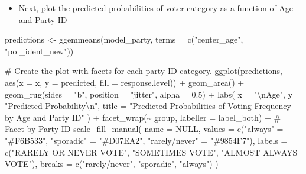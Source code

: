 \documentclass[
  letterpaper,
  DIV=11,
  numbers=noendperiod]{scrartcl}
\newenvironment{Shaded}{\begin{snugshade}}{\end{snugshade}}
\newcommand{\AttributeTok}[1]{\textcolor[rgb]{0.40,0.45,0.13}{#1}}
\newcommand{\CommentTok}[1]{\textcolor[rgb]{0.37,0.37,0.37}{#1}}
\newcommand{\ConstantTok}[1]{\textcolor[rgb]{0.56,0.35,0.01}{#1}}
\newcommand{\FloatTok}[1]{\textcolor[rgb]{0.68,0.00,0.00}{#1}}
\newcommand{\FunctionTok}[1]{\textcolor[rgb]{0.28,0.35,0.67}{#1}}
\newcommand{\NormalTok}[1]{\textcolor[rgb]{0.00,0.23,0.31}{#1}}
\newcommand{\OtherTok}[1]{\textcolor[rgb]{0.00,0.23,0.31}{#1}}
\newcommand{\SpecialCharTok}[1]{\textcolor[rgb]{0.37,0.37,0.37}{#1}}
\newcommand{\StringTok}[1]{\textcolor[rgb]{0.13,0.47,0.30}{#1}}
\providecommand{\tightlist}{%
  \setlength{\itemsep}{0pt}\setlength{\parskip}{0pt}}\usepackage{longtable,booktabs,array}
\begin{document}
\begin{itemize}
\tightlist
\item
  Next, plot the predicted probabilities of voter category as a function
  of Age and Party ID
\end{itemize}

\begin{Shaded}
\begin{Highlighting}[]
\NormalTok{predictions }\OtherTok{\textless{}{-}} \FunctionTok{ggemmeans}\NormalTok{(model\_party, }\AttributeTok{terms =} \FunctionTok{c}\NormalTok{(}\StringTok{"center\_age"}\NormalTok{, }\StringTok{"pol\_ident\_new"}\NormalTok{))}

\CommentTok{\# Create the plot with facets for each party ID category.}
\FunctionTok{ggplot}\NormalTok{(predictions, }\FunctionTok{aes}\NormalTok{(}\AttributeTok{x =}\NormalTok{ x, }\AttributeTok{y =}\NormalTok{ predicted, }\AttributeTok{fill =}\NormalTok{ response.level)) }\SpecialCharTok{+}
  \FunctionTok{geom\_area}\NormalTok{() }\SpecialCharTok{+}
  \FunctionTok{geom\_rug}\NormalTok{(}\AttributeTok{sides =} \StringTok{"b"}\NormalTok{, }\AttributeTok{position =} \StringTok{"jitter"}\NormalTok{, }\AttributeTok{alpha =} \FloatTok{0.5}\NormalTok{) }\SpecialCharTok{+}
  \FunctionTok{labs}\NormalTok{(}
    \AttributeTok{x =} \StringTok{"}\SpecialCharTok{\textbackslash{}n}\StringTok{Age"}\NormalTok{,}
    \AttributeTok{y =} \StringTok{"Predicted Probability}\SpecialCharTok{\textbackslash{}n}\StringTok{"}\NormalTok{,}
    \AttributeTok{title =} \StringTok{"Predicted Probabilities of Voting Frequency by Age and Party ID"}
\NormalTok{  ) }\SpecialCharTok{+}
  \FunctionTok{facet\_wrap}\NormalTok{(}\SpecialCharTok{\textasciitilde{}}\NormalTok{ group, }\AttributeTok{labeller =}\NormalTok{ label\_both) }\SpecialCharTok{+}  \CommentTok{\# Facet by Party ID}
  \FunctionTok{scale\_fill\_manual}\NormalTok{(}
    \AttributeTok{name =} \ConstantTok{NULL}\NormalTok{,}
    \AttributeTok{values =} \FunctionTok{c}\NormalTok{(}\StringTok{"always"} \OtherTok{=} \StringTok{"\#F6B533"}\NormalTok{, }\StringTok{"sporadic"} \OtherTok{=} \StringTok{"\#D07EA2"}\NormalTok{, }\StringTok{"rarely/never"} \OtherTok{=} \StringTok{"\#9854F7"}\NormalTok{),}
    \AttributeTok{labels =} \FunctionTok{c}\NormalTok{(}\StringTok{"RARELY OR NEVER VOTE"}\NormalTok{, }\StringTok{"SOMETIMES VOTE"}\NormalTok{, }\StringTok{"ALMOST ALWAYS VOTE"}\NormalTok{),}
    \AttributeTok{breaks =} \FunctionTok{c}\NormalTok{(}\StringTok{"rarely/never"}\NormalTok{, }\StringTok{"sporadic"}\NormalTok{, }\StringTok{"always"}\NormalTok{)}
\NormalTok{  )}
\end{Highlighting}
\end{Shaded}
\end{document}

